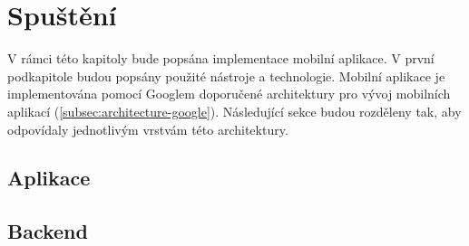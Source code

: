 \chapter{Spuštění}

\begin{chapterabstract}
	V rámci této kapitoly bude popsána implementace mobilní aplikace. V první podkapitole budou popsány použité nástroje a technologie. Mobilní aplikace je implementována pomocí Googlem doporučené architektury pro vývoj mobilních aplikací (\ref{subsec:architecture-google}). Následující sekce budou rozděleny tak, aby odpovídaly jednotlivým vrstvám této architektury.
\end{chapterabstract}

\section{Aplikace}

\section{Backend}